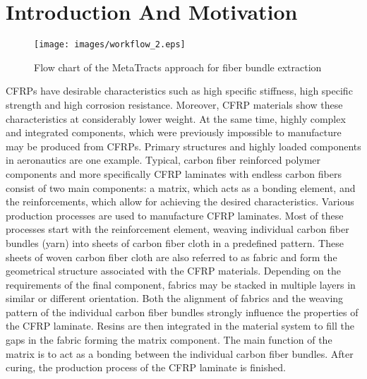 \section{Introduction And Motivation}\label{sec:intro}
\begin{figure*}[tb]
	\centering
	\texttt{[image: images/workflow\_2.eps]}
	\caption{Flow chart of the MetaTracts approach for fiber bundle extraction}
	\label{fig:flowchart}
\end{figure*}
 CFRPs have desirable characteristics such as high specific stiffness, high specific strength and high corrosion resistance. Moreover, CFRP materials show these characteristics at considerably lower weight. At the same time, highly complex and integrated components, which were previously impossible to manufacture may be produced from CFRPs. Primary structures and highly loaded components in aeronautics are one example. 
Typical, carbon fiber reinforced polymer components and more specifically CFRP laminates with endless carbon fibers consist of two main components: a matrix, which acts as a bonding element, and the reinforcements, which allow for achieving the desired characteristics. Various production processes are used to manufacture CFRP laminates. Most of these processes start with the reinforcement element, weaving individual carbon fiber bundles (yarn) into sheets of carbon fiber cloth in a predefined pattern. These sheets of woven carbon fiber cloth are also referred to as fabric and form the geometrical structure associated with the CFRP materials. Depending on the requirements of the final component, fabrics may be stacked in multiple layers in similar or different orientation. Both the  alignment of fabrics and the weaving pattern of the individual carbon fiber bundles strongly influence the properties of the CFRP laminate. Resins are then integrated in the material system to fill the gaps in the fabric forming the matrix component. The main function of the matrix is to act as a bonding between the individual carbon fiber bundles. After curing, the production process of the CFRP laminate is finished.

